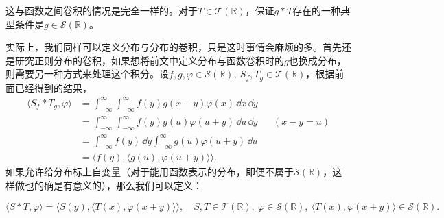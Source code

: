 这与函数之间卷积的情况是完全一样的。对于$T\in\mathcal{T}(\mathbb{R})$，保证$g*T$存在的一种典型条件是$g\in\mathcal{S}(\mathbb{R})$。

实际上，我们同样可以定义分布与分布的卷积，只是这时事情会麻烦的多。首先还是研究正则分布的卷积，如果想将前文中定义分布与函数卷积时的$g$也换成分布，则需要另一种方式来处理这个积分。设$f,g,\varphi\in\mathcal{S}(\mathbb{R}),\ S_f,T_g\in\mathcal{T}(\mathbb{R})$，根据前面已经得到的结果，
\begin{align}
    \langle S_f *T_g,\varphi\rangle & =\int_{-\infty}^{\infty}\int_{-\infty}^{\infty}f(y)g(x-y)\varphi(x)\,\dd x\,\dd y\nonumber           \\
                                    & =\int_{-\infty}^{\infty}\int_{-\infty}^{\infty}f(y)g(u)\varphi(u+y)\,\dd u\,\dd y && (x-y=u)\nonumber \\
                                    & =\int_{-\infty}^{\infty}f(y)\,\dd y\int_{-\infty}^{\infty}g(u)\varphi(u+y)\,\dd u\nonumber           \\
                                    & =\langle f(y),\langle g(u),\varphi(u+y)\rangle\rangle.
\end{align}
如果允许给分布标上自变量（对于能用函数表示的分布，即便不属于$\mathcal{S}(\mathbb{R})$，这样做也的确是有意义的），那么我们可以定义\cite{brad_osgood_ee261}：
\begin{definition}[分布与分布的卷积]\label{def:conv_distr_distr}
    \begin{equation}
        \langle S*T,\varphi\rangle=\langle S(y),\langle T(x),\varphi(x+y)\rangle\rangle,\quad S,T\in\mathcal{T}(\mathbb{R}),\ \varphi\in\mathcal{S}(\mathbb{R}),\ \langle T(x),\varphi(x+y)\rangle\in\mathcal{S}(\mathbb{R}).
    \end{equation}
\end{definition}

